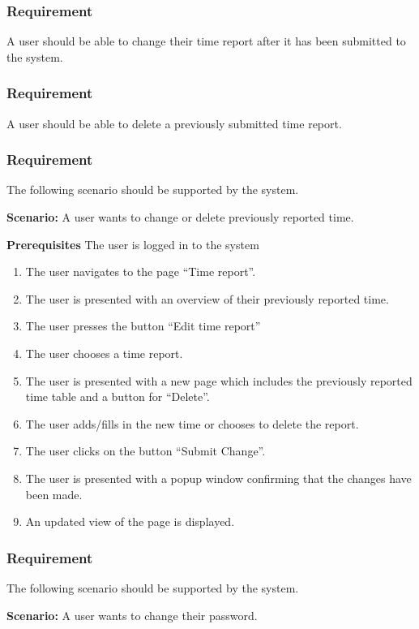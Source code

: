 \documentclass{article}
\begin{document}
\subsubsection{Requirement}
A user should be able to change their time report after it has been submitted to the system.
\subsubsection{Requirement}
A user should be able to delete a previously submitted time report.
\subsubsection{Requirement}
The following scenario should be supported by the system.

\textbf{Scenario:} A user wants to change or delete previously reported time.

\textbf{Prerequisites} The user is logged in to the system

\begin{enumerate}

\item The user navigates to the page “Time report”.
\item The user is presented with an overview of their previously reported time. 
\item The user presses the button “Edit time report”
\item The user chooses a time report.
\item The user is presented with a new page which includes the previously reported time table and a button for “Delete”. 
\item The user adds/fills in the new time or chooses to delete the report.
\item The user clicks on the button “Submit Change”.
\item The user is presented with a popup window confirming that the changes have been made.  
\item An updated view of the page is displayed.

\end{enumerate}


\subsubsection{Requirement}
The following scenario should be supported by the system.

\textbf{Scenario:} A user wants to change their password.
\end{document}
